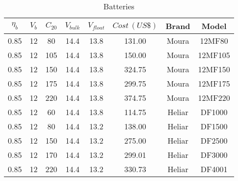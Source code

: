 \begin{table}
\caption{Batteries}\label{tab:battery}
\begin{scriptsize}
\begin{tabular}{|c|c|c|c|c|c|c|c|}
\hline
\hline
$\eta_{b}$  &  $V_{b}$  &  $C_{20}$  &  $V_{bulk}$  &  $V_{float}$  &  $Cost \, (US\$)$  &  Brand  &  Model \\
\hline
\hline
  0.85  &  12  &  80  &  14.4  &  13.8  &  131.00  &  Moura  &  12MF80  \\            
\hline
0.85 & 12 & 105 & 14.4 & 13.8 & 150.00 & Moura & 12MF105 \\
\hline
0.85 & 12 & 150 & 14.4 & 13.8 & 324.75 & Moura & 12MF150 \\
\hline
0.85 & 12 & 175 & 14.4 & 13.8 & 299.75 & Moura & 12MF175 \\
\hline
0.85 & 12 & 220 & 14.4 & 13.8 & 374.75 & Moura & 12MF220 \\
\hline
0.85 & 12 & 60 & 14.4 & 13.8 & 114.75 & Heliar & DF1000 \\     
\hline
0.85 & 12 & 80 & 14.4 & 13.2 & 138.00 & Heliar & DF1500 \\
\hline
0.85 & 12 & 150 & 14.4 & 13.2 & 275.00 & Heliar & DF2500 \\
\hline
0.85 & 12 & 170 & 14.4 & 13.2 & 299.01 & Heliar & DF3000 \\
\hline
0.85 & 12 & 220 & 14.4 & 13.2 & 330.73 & Heliar & DF4001 \\
\hline
\hline
\end{tabular}
\end{scriptsize}
\end{table}


